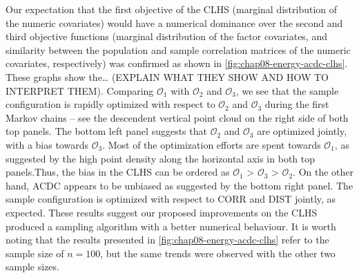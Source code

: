Our expectation that the first objective of the CLHS (marginal distribution of the numeric covariates) would 
have a
numerical dominance over the second and third objective functions (marginal distribution of the factor 
covariates, 
and similarity between the population and sample correlation matrices of the numeric covariates, respectively) 
was 
confirmed as shown in \autoref{fig:chap08-energy-acdc-clhs}. These graphs show the… (EXPLAIN WHAT THEY SHOW AND 
HOW TO INTERPRET THEM). Comparing $\mathcal{O}_1$ 
with $\mathcal{O}_2$ and $\mathcal{O}_3$, we see that the sample configuration is rapidly optimized with 
respect to $\mathcal{O}_2$ and $\mathcal{O}_3$ during the first Markov chains -- see the descendent vertical 
point cloud on the right side of both top panels. The bottom left panel suggests that $\mathcal{O}_2$ and 
$\mathcal{O}_3$ are optimized jointly, with a bias towards $\mathcal{O}_3$. Most of the optimization efforts 
are spent towards $\mathcal{O}_1$, as suggested by the high point density along the horizontal axis in both 
top panels.Thus, the bias in the CLHS can be ordered as $\mathcal{O}_1$ > $\mathcal{O}_3$ > $\mathcal{O}_2$. 
On the other hand, ACDC appears to be unbiased as suggested by the bottom right panel. The sample 
configuration 
is optimized with respect to CORR and DIST jointly, as expected. These results suggest our proposed 
improvements on the CLHS produced a sampling algorithm with a better numerical behaviour. It is worth noting 
that the results presented in \autoref{fig:chap08-energy-acdc-clhs} refer to the sample size of $n = 100$, but 
the same trends were observed with the other two sample sizes.

